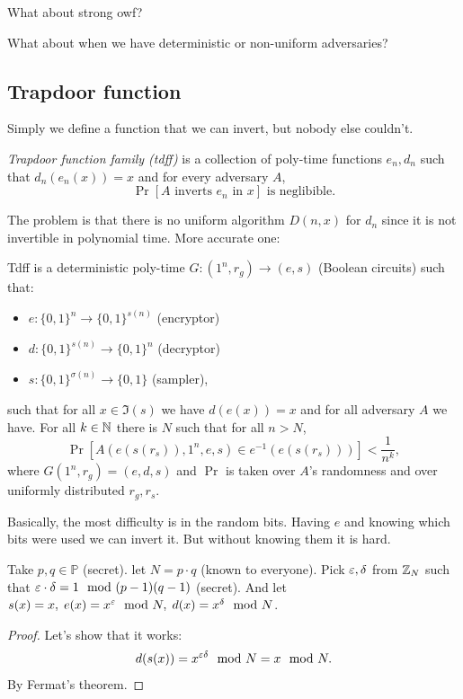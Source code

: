 \begin{exercise}
    What about strong owf?
\end{exercise}

\begin{exercise}
    What about when we have deterministic or non-uniform adversaries?
\end{exercise}

\subsection{Trapdoor function}

Simply we define a function that we can invert, but nobody else couldn't.
\begin{definition}
    \emph{Trapdoor function family (tdff)} is a collection of poly-time functions $e_n, d_n$ such that $d_n(e_n(x)) = x$ and for every adversary $A$,
    \[
        \Pr[A \text{ inverts } e_n \text{ in } x] \text{ is neglibible}.
    \]
\end{definition}
The problem is that there is no uniform algorithm $D(n, x)$ for $d_n$ since it is not invertible in polynomial time.
More accurate one:
\begin{definition}
    Tdff is a deterministic poly-time $G \colon (1^n, r_g) \to (e, s)$ (Boolean circuits) such that:
    \begin{itemize}
        \item $e \colon \{0, 1\}^n \to \{0, 1\}^{s(n)}$ (encryptor)
        \item $d \colon \{0, 1\}^{s(n)} \to \{0, 1\}^n$ (decryptor)
        \item $s \colon \{0, 1\}^{\sigma(n)} \to \{0, 1\}$ (sampler),
    \end{itemize}
    such that for all $x \in \Im(s)$ we have $d(e(x)) = x$ and for all adversary $A$ we have.
    For all $k \in \mathbb{N}$ there is $N$ such that for all $n > N$,
    \[
        \Pr[A(e(s(r_s)), 1^n, e, s) \in e^{-1}(e(s(r_s)))] < \frac 1 {n^k},
    \] where $G(1^n, r_g) = (e, d, s)$ and $\Pr$ is taken over $A$'s randomness and over uniformly distributed $r_g, r_s$.
\end{definition}
Basically, the most difficulty is in the random bits.
Having $e$ and knowing which bits were used we can invert it.
But without knowing them it is hard.

\begin{example}
    Take $p, q \in \mathbb P$ (secret).
    let $N = p \cdot q$ (known to everyone).
    Pick $\varepsilon, \delta$ from $\mathbb{Z}_N$ such that $\varepsilon \cdot \delta = 1 \mod (p - 1)(q - 1)$ (secret).
    And let $s(x) = x, \; e(x) = x^{\varepsilon} \mod N, \; d(x) = x^{\delta} \mod N$.
\end{example}
\begin{proof}
    Let's show that it works:
    \[
        d(s(x)) = x^{\varepsilon \delta} \mod N = x \mod N.
    \] By Fermat's theorem.
\end{proof}